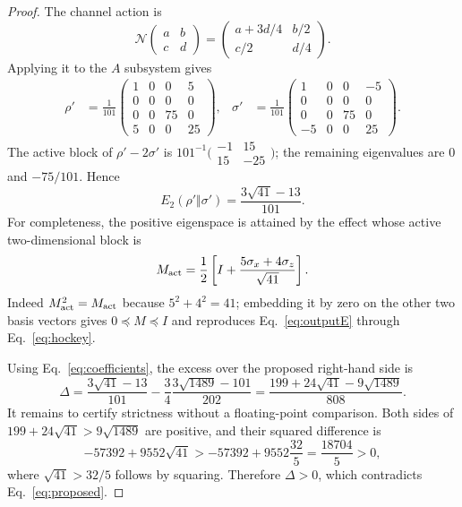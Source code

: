 \documentclass[11pt]{article}
\newcommand{\cN}{\mathcal N}
\newcommand{\psdle}{\preceq}
\begin{document}
\begin{proof}
The channel action is
\begin{equation}
 \cN\!\begin{pmatrix}a&b\\c&d\end{pmatrix}
 =\begin{pmatrix}a+3d/4&b/2\\c/2&d/4\end{pmatrix}.
 \label{eq:action}
\end{equation}
Applying it to the $A$ subsystem gives
\begin{align}
 \rho'&=\frac1{101}\begin{pmatrix}
 1&0&0&5\\0&0&0&0\\0&0&75&0\\5&0&0&25
 \end{pmatrix},
 &
 \sigma'&=\frac1{101}\begin{pmatrix}
 1&0&0&-5\\0&0&0&0\\0&0&75&0\\-5&0&0&25
 \end{pmatrix}.
 \label{eq:outputs}
\end{align}
The active block of $\rho'-2\sigma'$ is
$101^{-1}\bigl(\begin{smallmatrix}-1&15\\15&-25\end{smallmatrix}\bigr)$;
the remaining eigenvalues are $0$ and $-75/101$.  Hence
\begin{equation}
 E_2(\rho'\Vert\sigma')=\frac{3\sqrt{41}-13}{101}.
 \label{eq:outputE}
\end{equation}
For completeness, the positive eigenspace is attained by the effect whose
active two-dimensional block is
\begin{equation}
 M_{\rm act}=\frac12\left[I+\frac{5\sigma_x+4\sigma_z}{\sqrt{41}}\right].
 \label{eq:effect}
\end{equation}
Indeed $M_{\rm act}^2=M_{\rm act}$ because $5^2+4^2=41$; embedding it by
zero on the other two basis vectors gives $0\psdle M\psdle I$ and reproduces
Eq.~\eqref{eq:outputE} through Eq.~\eqref{eq:hockey}.

Using Eq.~\eqref{eq:coefficients}, the excess over the proposed right-hand
side is
\begin{equation}
 \Delta
 =\frac{3\sqrt{41}-13}{101}
  -\frac34\frac{3\sqrt{1489}-101}{202}
 =\frac{199+24\sqrt{41}-9\sqrt{1489}}{808}.
 \label{eq:margin}
\end{equation}
It remains to certify strictness without a floating-point comparison.  Both
sides of $199+24\sqrt{41}>9\sqrt{1489}$ are positive, and their squared
difference is
\begin{equation}
 -57392+9552\sqrt{41}
 >-57392+9552\frac{32}{5}
 =\frac{18704}{5}>0,
\end{equation}
where $\sqrt{41}>32/5$ follows by squaring.  Therefore $\Delta>0$, which
contradicts Eq.~\eqref{eq:proposed}.
\end{proof}
\end{document}
